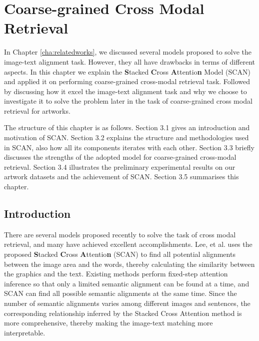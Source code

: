 \chapter{Coarse-grained Cross Modal Retrieval}
\label{cha:scan}
In Chapter \ref{cha:relatedworks}, we discussed several models proposed to solve the image-text alignment task. However, they all have drawbacks in terms of different aspects. In this chapter we explain the \textbf{S}tacked \textbf{C}ross \textbf{A}ttentio\textbf{n} Model (SCAN) \cite{scan} and applied it on performing coarse-grained cross-modal retrieval task. 
Followed by discussing how it excel the image-text alignment task and why we choose to investigate it to solve the problem later in the task of coarse-grained cross modal retrieval for artworks.

The structure of this chapter is as follows. Section 3.1 gives an introduction and motivation of SCAN. Section 3.2 explains the structure and methodologies used in SCAN, also how all its components iterates with each other. Section 3.3 briefly discusses the strengths of the adopted model for coarse-grained cross-modal retrieval. Section 3.4 illustrates the preliminary experimental results on our artwork datasets and the achievement of SCAN. Section 3.5 summarises this chapter.


\section{Introduction}

There are several models proposed recently to solve the task of cross modal retrieval, and many have achieved excellent accomplishments. Lee, et al. \cite{scan} uses the proposed \textbf{S}tacked \textbf{C}ross \textbf{A}ttentio\textbf{n} (SCAN) to find all potential alignments between the image area and the words, thereby calculating the similarity between the graphics and the text. Existing methods perform fixed-step attention inference so that only a limited semantic alignment can be found at a time, and SCAN can find all possible semantic alignments at the same time. Since the number of semantic alignments varies among different images and sentences, the corresponding relationship inferred by the Stacked Cross Attention method is more comprehensive, thereby making the image-text matching more interpretable.

